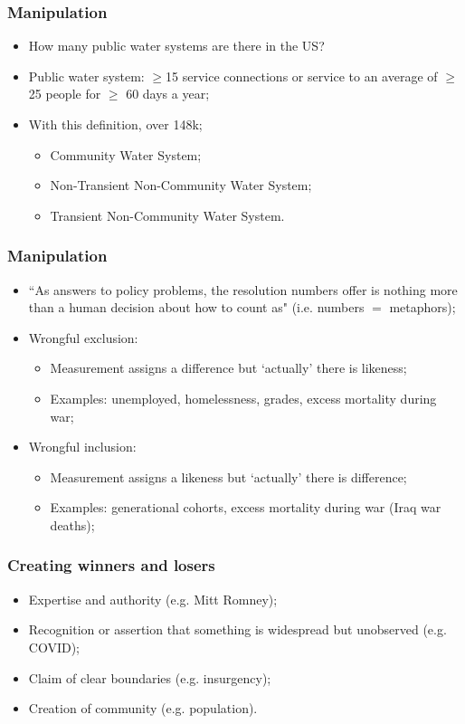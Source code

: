 \documentclass[aspectratio=169]{beamer}
\theoremstyle{principle}
\begin{document}
\begin{frame}
\frametitle{Manipulation}

\begin{itemize}
\item How many public water systems are there in the US?
\bigskip
\bigskip
\item Public water system: $\geq$15 service connections or service to an average of $\geq$ 25 people for $\geq$ 60 days a year;
\bigskip
\bigskip
\item With this definition, over 148k;
\begin{itemize}
\item Community Water System;
\item Non-Transient Non-Community Water System;
\item Transient Non-Community Water System.
\end{itemize}
\end{itemize}

\end{frame}

\begin{frame}
\frametitle{Manipulation}
\begin{itemize}
\item ``As answers to policy problems, the resolution numbers offer is nothing more than a human decision about how to count as"  (i.e. numbers $=$ metaphors);
\bigskip
\bigskip
\item Wrongful exclusion:
\begin{itemize}
\item Measurement assigns a difference but `actually' there is likeness;
\item Examples: unemployed, homelessness, grades, excess mortality during war;
\end{itemize}
\bigskip
\bigskip
\item Wrongful inclusion:
\begin{itemize}
\item Measurement assigns a likeness but `actually' there is difference;
\item Examples: generational cohorts, excess mortality during war (Iraq war deaths);
\end{itemize}
\end{itemize}
\end{frame}

\begin{frame}
\frametitle{Creating winners and losers}
\begin{itemize}
\item Expertise and authority (e.g. Mitt Romney);
\bigskip
\bigskip
\item Recognition or assertion that something is widespread but unobserved (e.g. COVID);
\bigskip
\bigskip
\item Claim of clear boundaries (e.g. insurgency);
\bigskip
\bigskip
\item Creation of community (e.g. population).
\end{itemize}
\end{frame}
\end{document}
